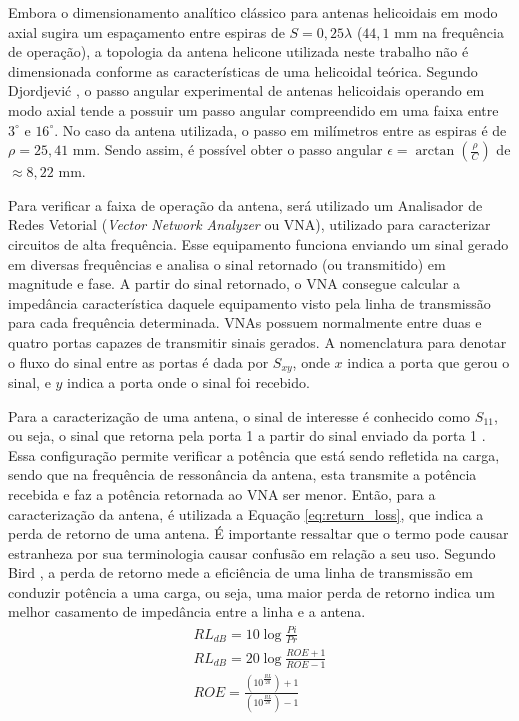Embora o dimensionamento analítico clássico para antenas helicoidais em modo axial sugira um espaçamento entre espiras de $S = 0,25\lambda$ ($44,1\text{ mm}$ na frequência de operação), a topologia da antena helicone utilizada neste trabalho não é dimensionada conforme as características de uma helicoidal teórica.
Segundo Djordjević \citeyear{djordjevic2006optimization}, o passo angular experimental de antenas helicoidais operando em modo axial tende a possuir um passo angular compreendido em uma faixa entre $3^{\circ}$ e $16^{\circ}$.
No caso da antena utilizada, o passo em milímetros entre as espiras é de $\rho=25,41\text{ mm}$. Sendo assim, é possível obter o passo angular $\epsilon=\arctan(\frac{\rho}{C})$ \cite{djordjevic2006optimization} de $\approx 8,22\text{ mm}$.

Para verificar a faixa de operação da antena, será utilizado um Analisador de Redes Vetorial (\textit{Vector Network Analyzer} ou VNA), utilizado para caracterizar circuitos de alta frequência.
Esse equipamento funciona enviando um sinal gerado em diversas frequências e analisa o sinal retornado (ou transmitido) em magnitude e fase. A partir do sinal retornado, o VNA consegue calcular a impedância característica daquele equipamento visto pela linha de transmissão para cada frequência determinada.
VNAs possuem normalmente entre duas e quatro portas capazes de transmitir sinais gerados. A nomenclatura para denotar o fluxo do sinal entre as portas é dada por $S_{xy}$, onde $x$ indica a porta que gerou o sinal, e $y$ indica a porta onde o sinal foi recebido.

Para a caracterização de uma antena, o sinal de interesse é conhecido como $S_{11}$, ou seja, o sinal que retorna pela porta 1 a partir do sinal enviado da porta 1 \cite{fusco2006}.
Essa configuração permite verificar a potência que está sendo refletida na carga, sendo que na frequência de ressonância da antena, esta transmite a potência recebida e faz a potência retornada ao VNA ser menor.
Então, para a caracterização da antena, é utilizada a Equação \ref{eq:return_loss}, que indica a perda de retorno de uma antena.
É importante ressaltar que o termo pode causar estranheza por sua terminologia causar confusão em relação a seu uso.
Segundo Bird \citeyear{bird2009}, a perda de retorno mede a eficiência de uma linha de transmissão em conduzir potência a uma carga, ou seja, uma maior perda de retorno indica um melhor casamento de impedância entre a linha e a antena.
\begin{align}
    RL_{dB} = 10\log{\frac{Pi}{Pr}} \label{eq:return_loss} \\
    RL_{dB} = 20\log{\frac{ROE+1}{ROE-1}} \label{eq:return_loss_ROE} \\
    ROE = \frac{(10^{\frac{RL}{20}})+1}{(10^{\frac{RL}{20}})-1} \label{eq:ROE}
\end{align}

